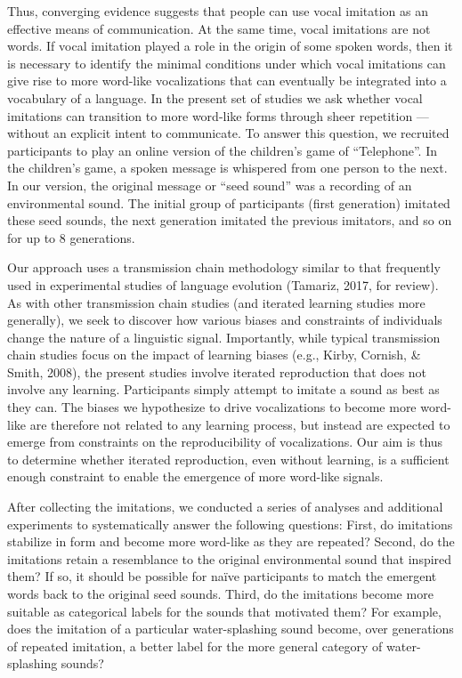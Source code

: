 \documentclass[english,floatsintext,man]{apa6}
\theoremstyle{definition}
\theoremstyle{definition}
\theoremstyle{definition}
\theoremstyle{remark}
\begin{document}
Thus, converging evidence suggests that people can use vocal imitation
as an effective means of communication. At the same time, vocal
imitations are not words. If vocal imitation played a role in the origin
of some spoken words, then it is necessary to identify the minimal
conditions under which vocal imitations can give rise to more word-like
vocalizations that can eventually be integrated into a vocabulary of a
language. In the present set of studies we ask whether vocal imitations
can transition to more word-like forms through sheer repetition ---
without an explicit intent to communicate. To answer this question, we
recruited participants to play an online version of the children's game
of \enquote{Telephone}. In the children's game, a spoken message is
whispered from one person to the next. In our version, the original
message or \enquote{seed sound} was a recording of an environmental
sound. The initial group of participants (first generation) imitated
these seed sounds, the next generation imitated the previous imitators,
and so on for up to 8 generations.

Our approach uses a transmission chain methodology similar to that
frequently used in experimental studies of language evolution (Tamariz,
2017, for review). As with other transmission chain studies (and
iterated learning studies more generally), we seek to discover how
various biases and constraints of individuals change the nature of a
linguistic signal. Importantly, while typical transmission chain studies
focus on the impact of learning biases (e.g., Kirby, Cornish, \& Smith,
2008), the present studies involve iterated reproduction that does not
involve any learning. Participants simply attempt to imitate a sound as
best as they can. The biases we hypothesize to drive vocalizations to
become more word-like are therefore not related to any learning process,
but instead are expected to emerge from constraints on the
reproducibility of vocalizations. Our aim is thus to determine whether
iterated reproduction, even without learning, is a sufficient enough
constraint to enable the emergence of more word-like signals.

After collecting the imitations, we conducted a series of analyses and
additional experiments to systematically answer the following questions:
First, do imitations stabilize in form and become more word-like as they
are repeated? Second, do the imitations retain a resemblance to the
original environmental sound that inspired them? If so, it should be
possible for naïve participants to match the emergent words back to the
original seed sounds. Third, do the imitations become more suitable as
categorical labels for the sounds that motivated them? For example, does
the imitation of a particular water-splashing sound become, over
generations of repeated imitation, a better label for the more general
category of water-splashing sounds?
\end{document}
